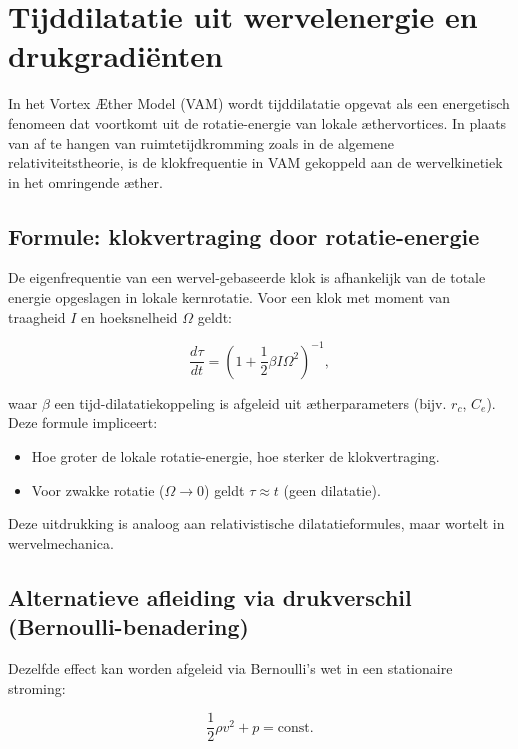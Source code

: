 
\section{Tijddilatatie uit wervelenergie en drukgradiënten}\label{sec:appendix_5}

In het Vortex Æther Model (VAM) wordt tijddilatatie opgevat als een energetisch fenomeen dat voortkomt uit de rotatie-energie van lokale æthervortices. In plaats van af te hangen van ruimtetijdkromming zoals in de algemene relativiteitstheorie, is de klokfrequentie in VAM gekoppeld aan de wervelkinetiek in het omringende æther.

\subsection{Formule: klokvertraging door rotatie-energie}

De eigenfrequentie van een wervel-gebaseerde klok is afhankelijk van de totale energie opgeslagen in lokale kernrotatie. Voor een klok met moment van traagheid $I$ en hoeksnelheid $\Omega$ geldt:

\begin{equation}
\frac{d\tau}{dt} = \left(1 + \frac{1}{2} \beta I \Omega^2 \right)^{-1},
\end{equation}

waar $\beta$ een tijd-dilatatiekoppeling is afgeleid uit ætherparameters (bijv. $r_c$, $C_e$). Deze formule impliceert:

\begin{itemize}
    \item Hoe groter de lokale rotatie-energie, hoe sterker de klokvertraging.
    \item Voor zwakke rotatie ($\Omega \to 0$) geldt $\tau \approx t$ (geen dilatatie).
\end{itemize}

Deze uitdrukking is analoog aan relativistische dilatatieformules, maar wortelt in wervelmechanica.

\subsection{Alternatieve afleiding via drukverschil (Bernoulli-benadering)}

Dezelfde effect kan worden afgeleid via Bernoulli’s wet in een stationaire stroming:

\begin{equation}
\frac{1}{2} \rho v^2 + p = \text{const.}
\end{equation}

